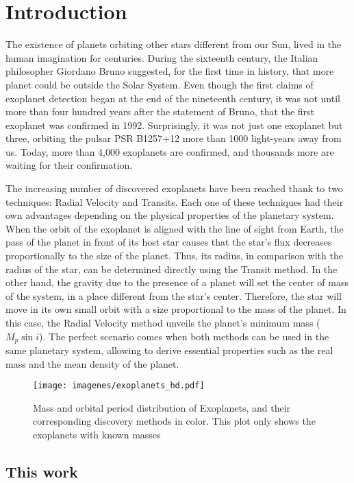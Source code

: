 \chapter{Introduction}\label{chap:intro}
The existence of planets orbiting other stars different from our Sun, lived in the human imagination for centuries. During the sixteenth century, the Italian philosopher Giordano Bruno suggested, for the first time in history, that more planet could be outside the Solar System. Even though the first claims of exoplanet detection began at the end of the nineteenth century, it was not until more than four hundred years after the statement of Bruno, that the first exoplanet was confirmed in 1992. Surprisingly, it was not just one exoplanet but three, orbiting the pulsar PSR B1257+12 more than 1000 light-years away from us. Today, more than 4,000 exoplanets are confirmed, and thousands more are waiting for their confirmation.

The increasing number of discovered exoplanets have been reached thank to two techniques: Radial Velocity and Transits. Each one of these techniques had their own advantages depending on the physical properties of the planetary system. When the orbit of the exoplanet is aligned with the line of sight from Earth, the pass of the planet in front of its host star causes that the star's flux decreases proportionally to the size of the planet. Thus, its radius, in comparison with the radius of the star, can be determined directly using the Transit method. In the other hand, the gravity due to the presence of a planet will set the center of mass of the system, in a place different from the star's center. Therefore, the star will move in its own small orbit with a size proportional to the mass of the planet. In this case, the Radial Velocity method unveils the planet's minimum mass ($M_{p}\sin i$). The perfect scenario comes when both methods can be used in the same planetary system, allowing to derive essential properties such as the real mass and the mean density of the planet.

\begin{figure}[H]
\centering
\texttt{[image: imagenes/exoplanets\_hd.pdf]}
\caption{Mass and orbital period distribution of Exoplanets, and their corresponding discovery methods in color. This plot only shows the exoplanets with known masses}
\label{exoplanets}
\end{figure}

\section{This work}

